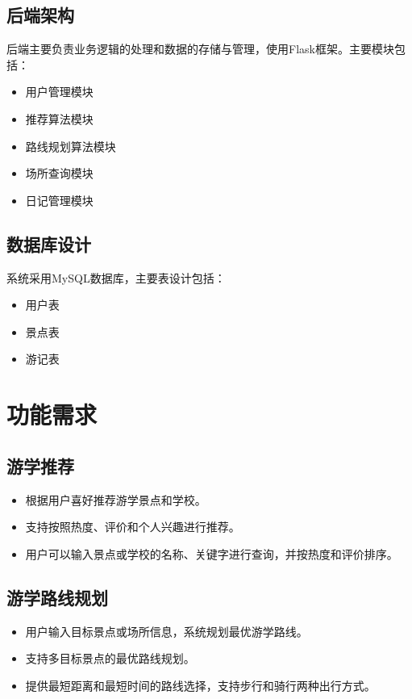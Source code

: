 \documentclass{ctexart}
\begin{document}
\subsection{后端架构}
后端主要负责业务逻辑的处理和数据的存储与管理，使用Flask框架。主要模块包括：
\begin{itemize}
    \item 用户管理模块
    \item 推荐算法模块
    \item 路线规划算法模块
    \item 场所查询模块
    \item 日记管理模块
\end{itemize}

\subsection{数据库设计}
系统采用MySQL数据库，主要表设计包括：
\begin{itemize}
    \item 用户表
    \item 景点表
    \item 游记表
\end{itemize}

\section{功能需求}

\subsection{游学推荐}
\begin{itemize}
    \item 根据用户喜好推荐游学景点和学校。
    \item 支持按照热度、评价和个人兴趣进行推荐。
    \item 用户可以输入景点或学校的名称、关键字进行查询，并按热度和评价排序。
\end{itemize}

\subsection{游学路线规划}
\begin{itemize}
    \item 用户输入目标景点或场所信息，系统规划最优游学路线。
    \item 支持多目标景点的最优路线规划。
    \item 提供最短距离和最短时间的路线选择，支持步行和骑行两种出行方式。
\end{itemize}
\end{document}
